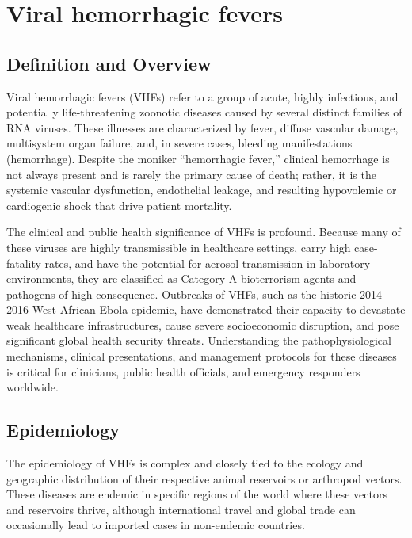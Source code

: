 \chapter{Viral hemorrhagic fevers}

\section*{Definition and Overview}
Viral hemorrhagic fevers (VHFs) refer to a group of acute, highly infectious, and potentially life-threatening zoonotic diseases caused by several distinct families of RNA viruses. These illnesses are characterized by fever, diffuse vascular damage, multisystem organ failure, and, in severe cases, bleeding manifestations (hemorrhage). Despite the moniker ``hemorrhagic fever,'' clinical hemorrhage is not always present and is rarely the primary cause of death; rather, it is the systemic vascular dysfunction, endothelial leakage, and resulting hypovolemic or cardiogenic shock that drive patient mortality.

The clinical and public health significance of VHFs is profound. Because many of these viruses are highly transmissible in healthcare settings, carry high case-fatality rates, and have the potential for aerosol transmission in laboratory environments, they are classified as Category A bioterrorism agents and pathogens of high consequence. Outbreaks of VHFs, such as the historic 2014--2016 West African Ebola epidemic, have demonstrated their capacity to devastate weak healthcare infrastructures, cause severe socioeconomic disruption, and pose significant global health security threats. Understanding the pathophysiological mechanisms, clinical presentations, and management protocols for these diseases is critical for clinicians, public health officials, and emergency responders worldwide.

\section*{Epidemiology}
The epidemiology of VHFs is complex and closely tied to the ecology and geographic distribution of their respective animal reservoirs or arthropod vectors. These diseases are endemic in specific regions of the world where these vectors and reservoirs thrive, although international travel and global trade can occasionally lead to imported cases in non-endemic countries.

